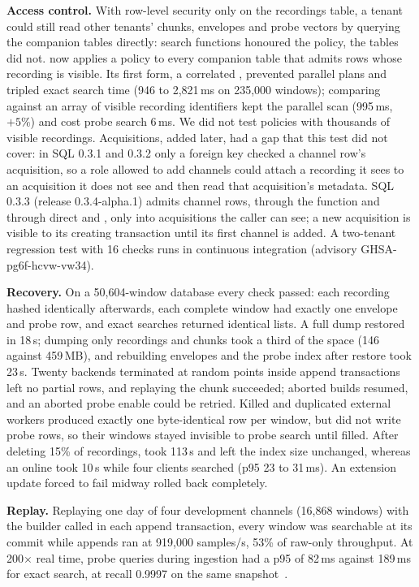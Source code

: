 \documentclass[sigconf,nonacm]{acmart}
\begin{document}
\textbf{Access control.} With row-level security only on the recordings table, a tenant could still read other tenants' chunks, envelopes and probe vectors by querying the companion tables directly: search functions honoured the policy, the tables did not.  now applies a policy to every companion table that admits rows whose recording is visible. Its first form, a correlated , prevented parallel plans and tripled exact search time (946 to 2,821\,ms on 235,000 windows); comparing against an array of visible recording identifiers kept the parallel scan (995\,ms, $+5\%$) and cost probe search 6\,ms. We did not test policies with thousands of visible recordings. Acquisitions, added later, had a gap that this test did not cover: in SQL 0.3.1 and 0.3.2 only a foreign key checked a channel row's acquisition, so a role allowed to add channels could attach a recording it sees to an acquisition it does not see and then read that acquisition's metadata. SQL 0.3.3 (release 0.3.4-alpha.1) admits channel rows, through the function and through direct  and , only into acquisitions the caller can see; a new acquisition is visible to its creating transaction until its first channel is added. A two-tenant regression test with 16 checks runs in continuous integration (advisory GHSA-pg6f-hcvw-vw34).

\textbf{Recovery.} On a 50,604-window database every check passed: each recording hashed identically afterwards, each complete window had exactly one envelope and probe row, and exact searches returned identical lists. A full dump restored in 18\,s; dumping only recordings and chunks took a third of the space (146 against 459\,MB), and rebuilding envelopes and the probe index after restore took 23\,s. Twenty backends terminated at random points inside append transactions left no partial rows, and replaying the chunk succeeded; aborted builds resumed, and an aborted probe enable could be retried. Killed and duplicated external workers produced exactly one byte-identical row per window, but did not write probe rows, so their windows stayed invisible to probe search until filled. After deleting 15\% of recordings,  took 113\,s and left the index size unchanged, whereas an online   took 10\,s while four clients searched (p95 23 to 31\,ms). An extension update forced to fail midway rolled back completely.

\textbf{Replay.} Replaying one day of four development channels (16,868 windows) with the builder called in each append transaction, every window was searchable at its commit while appends ran at 919,000 samples/s, 53\% of raw-only throughput. At 200$\times$ real time, probe queries during ingestion had a p95 of 82\,ms against 189\,ms for exact search, at recall 0.9997 on the same snapshot~\cite{bl1}.
\end{document}
